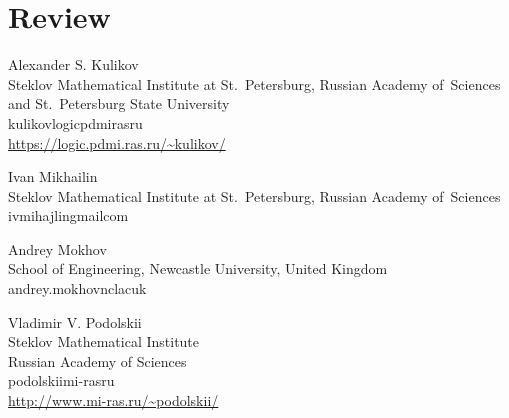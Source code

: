 \documentclass{toc}
\begin{document}
\clearpage

\appendix
\section{Review}









\begin{tocauthors}
\begin{tocinfo}[kulikov]
    Alexander S. Kulikov\\
    Steklov Mathematical Institute at St.~Petersburg,     Russian Academy of~Sciences\\ and St.~Petersburg State University\\
    kulikov\tocat{}logic\tocdot{}pdmi\tocdot{}ras\tocdot{}ru\\
    \url{https://logic.pdmi.ras.ru/\~kulikov/}
\end{tocinfo}
\begin{tocinfo}[mikhailin]
    Ivan Mikhailin\\
    Steklov Mathematical Institute at St.~Petersburg,     Russian Academy of~Sciences\\
    ivmihajlin\tocat{}gmail\tocdot{}com
\end{tocinfo}
\begin{tocinfo}[mokhov]
    Andrey Mokhov\\
    School of Engineering, Newcastle University, United Kingdom\\
    andrey.mokhov\tocat{}ncl\tocdot{}ac\tocdot{}uk
\end{tocinfo}
\begin{tocinfo}[podolskii]
    Vladimir V. Podolskii\\
    Steklov Mathematical Institute\\
    Russian Academy of Sciences\\
    podolskii\tocat{}mi-ras\tocdot{}ru\\
    \url{http://www.mi-ras.ru/\~podolskii/}
\end{tocinfo}
\end{tocauthors}
\end{document}
